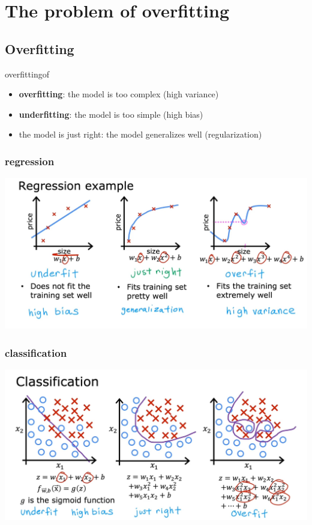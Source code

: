 \chapter{The problem of overfitting}
\section{Overfitting}
\begin{dfnbox}{overfitting}{of}
    \begin{itemize}
        \item \textbf{overfitting}: the model is too complex (high variance)
        \item \textbf{underfitting}: the model is too simple (high bias)
        \item the model is just right: the model generalizes well (regularization)
    \end{itemize}
\end{dfnbox}
\subsection*{regression}
\includegraphics*[width=\textwidth]{images/7.1 (2).jpg}
\subsection*{classification}
\includegraphics*[width=\textwidth]{images/7.1 (1).jpg}


